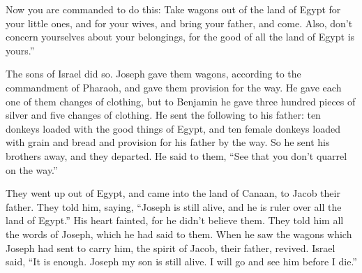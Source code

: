 {Now you are commanded to do this: Take wagons out of the land of Egypt for your little ones, and for your wives, and bring your father, and come.
Also, don’t concern yourselves about your belongings, for the good of all the land of Egypt is yours.”
\par }{\PP {}The sons of Israel did so. Joseph gave them wagons, according to the commandment of Pharaoh, and gave them provision for the way.
He gave each one of them changes of clothing, but to Benjamin he gave three hundred pieces of silver and five changes of clothing.
He sent the following to his father: ten donkeys loaded with the good things of Egypt, and ten female donkeys loaded with grain and bread and provision for his father by the way.
So he sent his brothers away, and they departed. He said to them, “See that you don’t quarrel on the way.”
\par }{\PP {}They went up out of Egypt, and came into the land of Canaan, to Jacob their father.
They told him, saying, “Joseph is still alive, and he is ruler over all the land of Egypt.” His heart fainted, for he didn’t believe them.
They told him all the words of Joseph, which he had said to them. When he saw the wagons which Joseph had sent to carry him, the spirit of Jacob, their father, revived.
Israel said, “It is enough. Joseph my son is still alive. I will go and see him before I die.”

}
